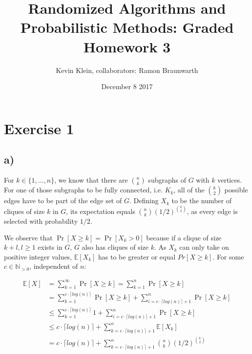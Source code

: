 \documentclass[a4paper,german]{article}
\title{Randomized Algorithms and Probabilistic Methods: Graded Homework 3}
\author{ Kevin Klein, collaborators: Ramon Braunwarth}
\date{December 8 2017}
\newcommand{\E}{\mathbb{E}}
\begin{document}
\maketitle

\section*{Exercise 1}
\subsection*{a)}
For \(k \in \{1, \dots, n\}\), we know that there are \( n \choose k\) subgraphs of \(G\) with \(k\) vertices. For one of those subgraphs to be fully connected, i.e. \(K_k\), all of the \(k \choose 2\) possible edges have to be part of the edge set of \(G\).  Defining \(X_k\) to be the number of cliques of size \(k\) in \(G\), its expectation equals  \( {n \choose k} (1/2)^{k \choose 2}\), as every edge is selected with probability \(1/2\). 

We observe that \(\Pr [X \geq k] = \Pr[X_k > 0]\) because if a clique of size \(k + l, l \geq 1\) exists in \(G\), \(G\) also has cliques of size \(k\). As \(X_k\) can only take on positive  integer values, \(\E[X_k]\) has to be greater or equal \(Pr[X \geq k]\). For some \(c \in \mathbb{N}_{>0}\), independent of \(n\):

\begin{align*}
\E[X] &= \sum_{k=1}^\infty \Pr[X \geq k] =  \sum_{k=1}^n \Pr[X \geq k] \\
&= \sum_{k=1}^{c \cdot \lceil log(n) \rceil} \Pr[X \geq k]  + \sum_{i = c \cdot \lceil log(n) \rceil + 1} ^ n \Pr[X \geq k]   \\
&\leq \sum_{k=1}^{c \cdot \lceil log(n) \rceil} 1  + \sum_{i = c \cdot \lceil log(n) \rceil + 1} ^ n \Pr[X \geq k]   \\
&\leq  c \cdot \lceil log(n) \rceil + \sum_{k=c \cdot \lceil log(n) \rceil + 1}^n \E[X_k] \\
&= c \cdot \lceil log(n) \rceil+ \sum_{k=c \cdot \lceil log(n) \rceil + 1}^n {n \choose k} (1/2)^{k \choose 2}
\end{align*}
\end{document}
